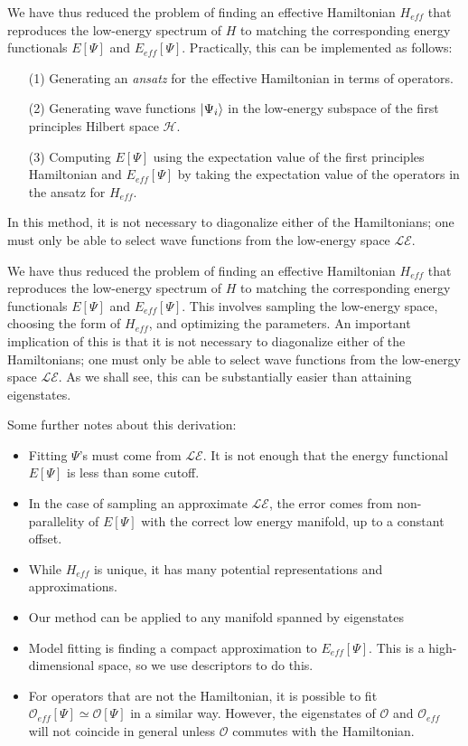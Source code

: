 We have thus reduced the problem of finding an effective Hamiltonian $H_{eff}$ that reproduces the low-energy spectrum of $H$ to matching the corresponding energy functionals $E[\Psi]$ and $E_{eff}[\Psi]$. 
Practically, this can be implemented as follows: 
\begin{itemize}
\item [(1)]Generating an \textit{ansatz} for the effective Hamiltonian in terms of operators. 
\item [(2)]Generating wave functions $\ket{\Psi_i}$ in the low-energy subspace of the first principles Hilbert space ${\mathcal H}$.
\item [(3)]Computing $E[\Psi]$ using the expectation value of the first principles Hamiltonian and $E_{eff}[\Psi]$ by taking the expectation value of the operators in the ansatz for $H_{eff}$. 
\end{itemize}
In this method, it is not necessary to diagonalize either of the Hamiltonians; one must only be able to select wave functions from the low-energy space $\mathcal{LE}$.

We have thus reduced the problem of finding an effective Hamiltonian $H_{eff}$ that reproduces the low-energy spectrum of $H$ to matching the corresponding energy functionals $E[\Psi]$ and $E_{eff}[\Psi]$. 
This involves sampling the low-energy space, choosing the form of $H_{eff}$, and optimizing the parameters.
An important implication of this is that it is not necessary to diagonalize either of the Hamiltonians; one must only be able to select wave functions from the low-energy space $\mathcal{LE}$.
As we shall see, this can be substantially easier than attaining eigenstates.

Some further notes about this derivation:
\begin{itemize}
\item Fitting $\Psi$'s must come from $\mathcal{LE}$. It is not enough that the energy functional $E[\Psi]$ is less than some cutoff.
\item In the case of sampling an approximate $\mathcal{LE}$, the error comes from non-parallelity of $E[\Psi]$ with the correct low energy manifold, up to a constant offset.
\item While $H_{eff}$ is unique, it has many potential representations and approximations. 
\item Our method can be applied to any manifold spanned by eigenstates
\item Model fitting is finding a compact approximation to $E_{eff}[\Psi]$. This is a high-dimensional space, so we use descriptors to do this.	
\item For operators that are not the Hamiltonian, it is possible to fit $\mathcal{O}_{eff}[\Psi] \simeq {\mathcal O}[\Psi]$ in a similar way. However, the eigenstates of ${\mathcal O}$ and ${\mathcal O}_{eff}$ will not coincide in general unless $\mathcal{O}$ commutes with the Hamiltonian.
\end{itemize}


